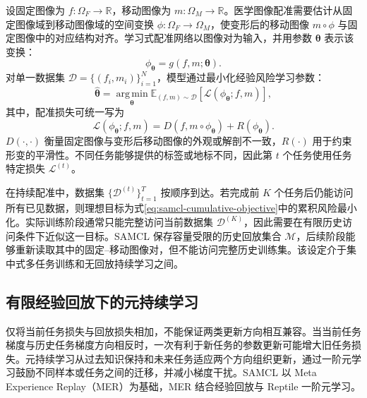 设固定图像为 $f:\Omega_F\rightarrow\mathbb{R}$，移动图像为 $m:\Omega_M\rightarrow\mathbb{R}$。医学图像配准需要估计从固定图像域到移动图像域的空间变换
$\phi:\Omega_F\rightarrow\Omega_M$，使变形后的移动图像
$m\circ\phi$ 与固定图像中的对应结构对齐。学习式配准网络以图像对为输入，并用参数 $\boldsymbol{\theta}$ 表示该变换：
\begin{equation}
\phi_{\boldsymbol{\theta}}
=
g(f,m;\boldsymbol{\theta}).
\label{eq:samcl-registration-network}
\end{equation}
对单一数据集 $\mathcal{D}=\{(f_i,m_i)\}_{i=1}^{N}$，模型通过最小化经验风险学习参数：
\begin{equation}
\widehat{\boldsymbol{\theta}}
=
\operatorname*{arg\,min}_{\boldsymbol{\theta}}
\mathbb{E}_{(f,m)\sim\mathcal{D}}
\left[
\mathcal{L}(\phi_{\boldsymbol{\theta}};f,m)
\right],
\label{eq:samcl-single-task-objective}
\end{equation}
其中，配准损失可统一写为
\begin{equation}
\mathcal{L}(\phi_{\boldsymbol{\theta}};f,m)
=
D\!\left(f,m\circ\phi_{\boldsymbol{\theta}}\right)
+
R\!\left(\phi_{\boldsymbol{\theta}}\right).
\label{eq:samcl-registration-loss}
\end{equation}
$D(\cdot,\cdot)$ 衡量固定图像与变形后移动图像的外观或解剖不一致，$R(\cdot)$ 用于约束形变的平滑性。不同任务能够提供的标签或地标不同，因此第 $t$ 个任务使用任务特定损失 $\mathcal{L}^{(t)}$。

在持续配准中，数据集
$\{\mathcal{D}^{(t)}\}_{t=1}^{T}$ 按顺序到达。若完成前 $K$ 个任务后仍能访问所有已见数据，则理想目标为式\eqref{eq:samcl-cumulative-objective}中的累积风险最小化。实际训练阶段通常只能完整访问当前数据集 $\mathcal{D}^{(K)}$，因此需要在有限历史访问条件下近似这一目标。SAMCL 保存容量受限的历史回放集合 $\mathcal{M}$，后续阶段能够重新读取其中的固定--移动图像对，但不能访问完整历史训练集。该设定介于集中式多任务训练和无回放持续学习之间。

\subsection{有限经验回放下的元持续学习}
\label{subsec:samcl-meta-continual}

仅将当前任务损失与回放损失相加，不能保证两类更新方向相互兼容。当当前任务梯度与历史任务梯度方向相反时，一次有利于新任务的参数更新可能增大旧任务损失。元持续学习从过去知识保持和未来任务适应两个方向组织更新，通过一阶元学习鼓励不同样本或任务之间的迁移，并减小梯度干扰。SAMCL 以 Meta Experience Replay（MER）为基础，MER 结合经验回放与 Reptile 一阶元学习\cite{riemer2019mer,nichol2018firstorder,method_replay_er}。

